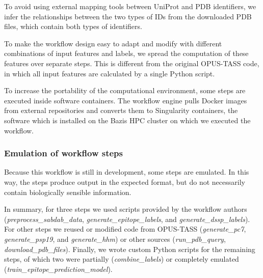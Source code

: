 To avoid using external mapping tools between UniProt and PDB identifiers, we infer the relationships between the two types of IDs from the downloaded PDB files, which contain both types of identifiers. 

To make the workflow design easy to adapt and modify with different combinations of input features and labels, we spread the computation of these features over separate steps. This is different from the original OPUS-TASS code, in which all input features are calculated by a single Python script. 

To increase the portability of the computational environment, some steps are executed inside software containers. The workflow engine pulls Docker images from external repositories and converts them to Singularity \cite{kurtzer_2017} containers, the software which is installed on the Bazis HPC cluster on which we executed the workflow. 

\subsubsection{Emulation of workflow steps} 
Because this workflow is still in development, some steps are emulated. In this way, the steps produce output in the expected format, but do not necessarily contain biologically sensible information. 

In summary, for three steps we used scripts provided by the workflow authors (\emph{preprocess\_sabdab\_data}, \emph{generate\_epitope\_labels}, and \emph{generate\_dssp\_labels}). For other steps we reused or modified code from OPUS-TASS (\emph{generate\_pc7}, \emph{generate\_psp19}, and \emph{generate\_hhm}) or other sources (\emph{run\_pdb\_query}, \emph{download\_pdb\_files}). Finally, we wrote custom Python scripts for the remaining steps, of which two were partially (\emph{combine\_labels}) or completely emulated (\emph{train\_epitope\_prediction\_model}). 

